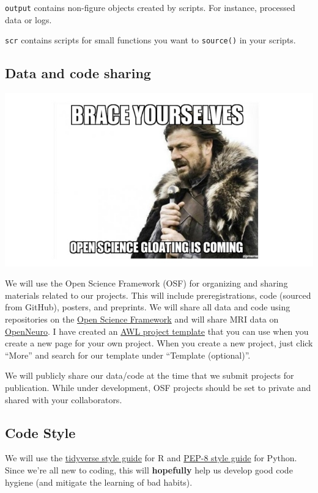\documentclass[]{book}
\begin{document}
\texttt{output} contains non-figure objects created by scripts. For instance, processed data or logs.

\texttt{scr} contains scripts for small functions you want to \texttt{source()} in your scripts.

\hypertarget{data-and-code-sharing}{%
\subsection{Data and code sharing}\label{data-and-code-sharing}}

\includegraphics{images/open_science.jpg}

We will use the Open Science Framework (OSF) for organizing and sharing materials related to our projects. This will include preregistrations, code (sourced from GitHub), posters, and preprints. We will share all data and code using repositories on the \href{https://osf.io/}{Open Science Framework} and will share MRI data on \href{https://openneuro.org/}{OpenNeuro}. I have created an \href{https://osf.io/ce8p4/}{AWL project template} that you can use when you create a new page for your own project. When you create a new project, just click ``More'' and search for our template under ``Template (optional)''.

We will publicly share our data/code at the time that we submit projects for publication. While under development, OSF projects should be set to private and shared with your collaborators.

\hypertarget{code-style}{%
\subsection{Code Style}\label{code-style}}

We will use the \href{https://style.tidyverse.org/}{tidyverse style guide} for R and \href{https://www.python.org/dev/peps/pep-0008/}{PEP-8 style guide} for Python. Since we're all new to coding, this will \textbf{hopefully} help us develop good code hygiene (and mitigate the learning of bad habits).
\end{document}
